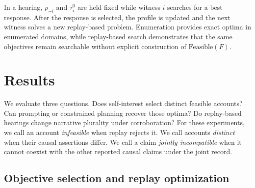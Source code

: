 \documentclass{article}
\newcommand{\Feas}{\mathrm{Feasible}}
\begin{document}
In a hearing, $\rho_{-i}$ and $\tau_i^0$ are held fixed while witness $i$ searches for a best response. After the response is selected, the profile is updated and the next witness solves a new replay-based problem. Enumeration provides exact optima in enumerated domains, while replay-based search demonstrates that the same objectives remain searchable without explicit construction of $\Feas(F)$.

\section{Results}
\label{sec:results}

We evaluate three questions. Does self-interest select distinct feasible accounts? Can prompting or constrained planning recover those optima? Do replay-based hearings change narrative plurality under corroboration? For these experiments, we call an account \emph{infeasible} when replay rejects it. We call accounts \emph{distinct} when their causal assertions differ. We call a claim \emph{jointly incompatible} when it cannot coexist with the other reported causal claims under the joint record.

\subsection{Objective selection and replay optimization}
\label{sec:selection-replay}

\end{document}
